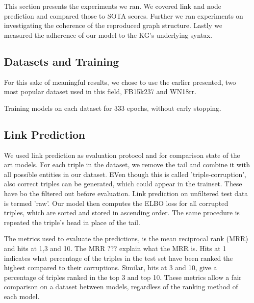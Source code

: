 
This section presents the experiments we ran. We covered link and node prediction and compared those to SOTA scores. Further we ran experiments on investigating the coherence of the reproduced graph structure. Lastly we measured the adherence of our model to the KG's underlying syntax.

\subsection{Datasets and Training}
For this sake of meaningful results, we chose to use the earlier presented, two most popular dataset used in this field, FB15k237 and WN18rr.

Training models on each dataset for 333 epochs, without early stopping.

\subsection{Link Prediction}

We used link prediction as evaluation protocol and for comparison state of the art models. For each triple in the dataset, we remove the tail and combine it with all possible entities in our dataset. EVen though this is called 'triple-corruption', also correct triples can be generated, which could appear in the trainset. These have bo the filtered out before evaluation. Link prediction on unfiltered test data is termed 'raw'. Our model then computes the ELBO loss for all corrupted triples, which are sorted and stored in ascending order. The same procedure is repeated the triple's head in place of the tail.


The metrics used to evaluate the predictions, is the mean reciprocal rank (MRR) and hits at 1,3 and 10.
The MRR ??? explain what the MRR is. \linebreak
Hits at 1 indicates what percentage of the triples in the test set have been ranked the highest compared to their corruptions. Similar, hits at 3 and 10, give a percentage of triples ranked in the top 3 and top 10.
These metrics allow a fair comparison on a dataset between models, regardless of the ranking method of each model.



